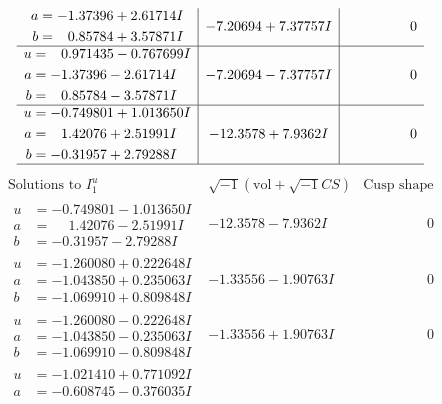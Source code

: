 \documentclass[1p]{elsarticle_modified}
\theoremstyle{definition}
\newcommand{\I}{\sqrt{-1}}
\begin{document}
$$\begin{array}{c|c|c}
\begin{aligned}
a &= -1.37396 + 2.61714 I \\
b &= \phantom{-}0.85784 + 3.57871 I\end{aligned}
 & -7.20694 + 7.37757 I & \phantom{-0.000000 } 0 \\ \hline\begin{aligned}
u &= \phantom{-}0.971435 - 0.767699 I \\
a &= -1.37396 - 2.61714 I \\
b &= \phantom{-}0.85784 - 3.57871 I\end{aligned}
 & -7.20694 - 7.37757 I & \phantom{-0.000000 } 0 \\ \hline\begin{aligned}
u &= -0.749801 + 1.013650 I \\
a &= \phantom{-}1.42076 + 2.51991 I \\
b &= -0.31957 + 2.79288 I\end{aligned}
 & -12.3578 + 7.9362 I & \phantom{-0.000000 } 0\\
 \hline 
 \end{array}$$\newpage$$\begin{array}{c|c|c}  
\text{Solutions to }I^u_{1}& \I (\text{vol} + \sqrt{-1}CS) & \text{Cusp shape}\\
 \hline 
\begin{aligned}
u &= -0.749801 - 1.013650 I \\
a &= \phantom{-}1.42076 - 2.51991 I \\
b &= -0.31957 - 2.79288 I\end{aligned}
 & -12.3578 - 7.9362 I & \phantom{-0.000000 } 0 \\ \hline\begin{aligned}
u &= -1.260080 + 0.222648 I \\
a &= -1.043850 + 0.235063 I \\
b &= -1.069910 + 0.809848 I\end{aligned}
 & -1.33556 - 1.90763 I & \phantom{-0.000000 } 0 \\ \hline\begin{aligned}
u &= -1.260080 - 0.222648 I \\
a &= -1.043850 - 0.235063 I \\
b &= -1.069910 - 0.809848 I\end{aligned}
 & -1.33556 + 1.90763 I & \phantom{-0.000000 } 0 \\ \hline\begin{aligned}
u &= -1.021410 + 0.771092 I \\
a &= -0.608745 - 0.376035 I \\

\end{aligned}
\end{array}$$
\end{document}
